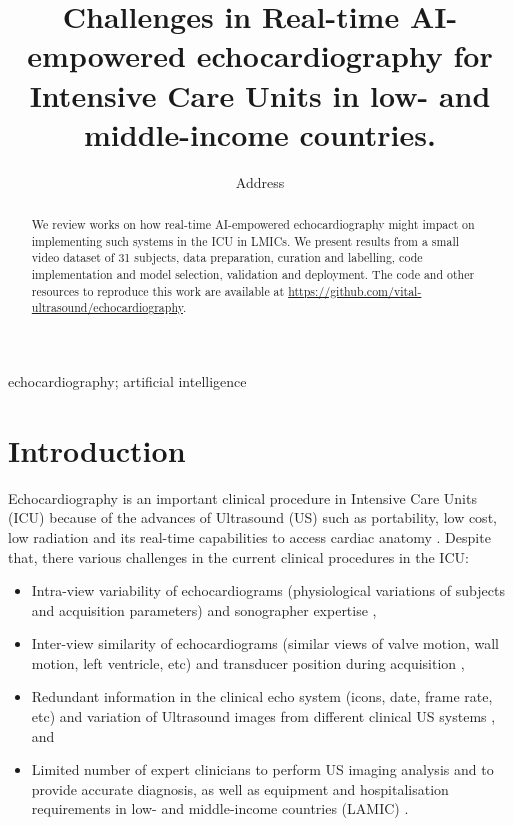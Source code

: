 \documentclass[mlabstract,twocolumn]{jmlr}
\title[Short Title]{
Challenges in Real-time AI-empowered echocardiography for Intensive Care Units in low- and middle-income countries. %
}
\author{
     \Name{Anonymous Author(s)} \Email{email@sample.com}
      \addr Address
   }
\begin{document}
\maketitle

\begin{abstract}
  We review works on how real-time AI-empowered echocardiography might impact on implementing such systems in the ICU in LMICs.
  We present results from a small video dataset of 31 subjects, data preparation, curation and labelling, code implementation and model selection, validation and deployment.
  The code and other resources to reproduce this work are available at \url{https://github.com/vital-ultrasound/echocardiography}.
\end{abstract}
\begin{keywords}
echocardiography; artificial intelligence
\end{keywords}

\section{Introduction}
\label{sec:intro}
Echocardiography is an important clinical procedure in Intensive Care Units (ICU) because of the advances of Ultrasound (US) such as portability, low cost, low radiation and its real-time capabilities to access cardiac anatomy \citep{Feigenbaum1996, Vieillard-Baron2008, singh2007, cambell2018}.
Despite that, there various challenges in the current clinical procedures in the ICU:
\begin{itemize}
\setlength\itemsep{0em}
\item Intra-view variability of echocardiograms (physiological variations of subjects and acquisition parameters) and sonographer expertise \citep{khamis2017, Feigenbaum1996, field2011},
\item Inter-view similarity of echocardiograms (similar views of valve motion, wall motion, left ventricle, etc) and transducer position during acquisition \citep{zhang2018},
\item Redundant information in the clinical echo system (icons, date, frame rate, etc) \citep{khamis2017} and variation of Ultrasound images from different clinical US systems \citep{brindise2020unsupervised}, and
\item Limited number of expert clinicians to perform US imaging analysis and to provide accurate diagnosis, as well as equipment and hospitalisation requirements in low- and middle-income countries (LAMIC) \citep{hao2021-wellcome, 2021-huyNhat-vanHao-in-FAIR-MICCAI}.
\end{itemize}
\end{document}

